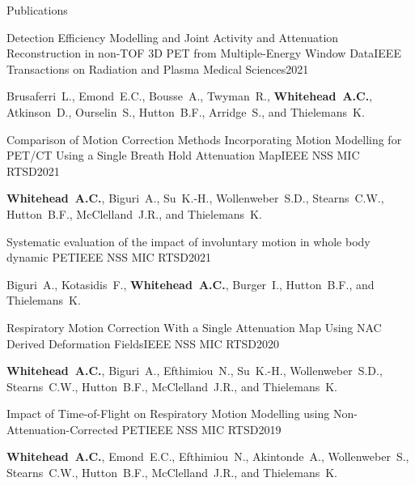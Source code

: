 \documentclass{cv}
\begin{document}
\begin{spacing}{1.0}
\begin{rSection}{Publications}
            \item \begin{rSubsection}{Detection Efficiency Modelling and Joint Activity and Attenuation Reconstruction in non-TOF 3D PET from Multiple-Energy Window Data}{}{IEEE Transactions on Radiation and Plasma Medical Sciences}{2021}
                \item Brusaferri~L., Emond~E.C., Bousse~A., Twyman~R., \textbf{Whitehead~A.C.}, Atkinson~D., Ourselin~S., Hutton~B.F., Arridge~S., and Thielemans~K.
            \end{rSubsection}
            
            \item \begin{rSubsection}{Comparison of Motion Correction Methods Incorporating Motion Modelling for PET/CT Using a Single Breath Hold Attenuation Map}{}{IEEE NSS MIC RTSD}{2021}
                \item \textbf{Whitehead~A.C.}, Biguri~A., Su~K.-H., Wollenweber~S.D., Stearns~C.W., Hutton~B.F., McClelland~J.R., and Thielemans~K.
            \end{rSubsection}
            
            \item \begin{rSubsection}{Systematic evaluation of the impact of involuntary motion in whole body dynamic PET}{}{IEEE NSS MIC RTSD}{2021}
                \item Biguri~A., Kotasidis~F., \textbf{Whitehead~A.C.}, Burger~I., Hutton~B.F., and Thielemans~K.
            \end{rSubsection}
            
            \item \begin{rSubsection}{Respiratory Motion Correction With a Single Attenuation Map Using NAC Derived Deformation Fields}{}{IEEE NSS MIC RTSD}{2020}
                \item \textbf{Whitehead~A.C.}, Biguri~A., Efthimiou~N., Su~K.-H., Wollenweber~S.D., Stearns~C.W., Hutton~B.F., McClelland~J.R., and Thielemans~K.
            \end{rSubsection}
            
            \item \begin{rSubsection}{Impact of Time-of-Flight on Respiratory Motion Modelling using Non-Attenuation-Corrected \newline PET}{}{IEEE NSS MIC RTSD}{2019}
                \item \textbf{Whitehead~A.C.}, Emond~E.C., Efthimiou~N., Akintonde~A., Wollenweber~S., Stearns~C.W., Hutton~B.F., McClelland~J.R., and Thielemans~K.
            \end{rSubsection}
            

\end{rSection}
\end{spacing}
\end{document}
